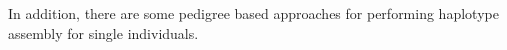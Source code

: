 % 
% 

In addition, there are some pedigree based approaches for performing haplotype assembly for single individuals.

